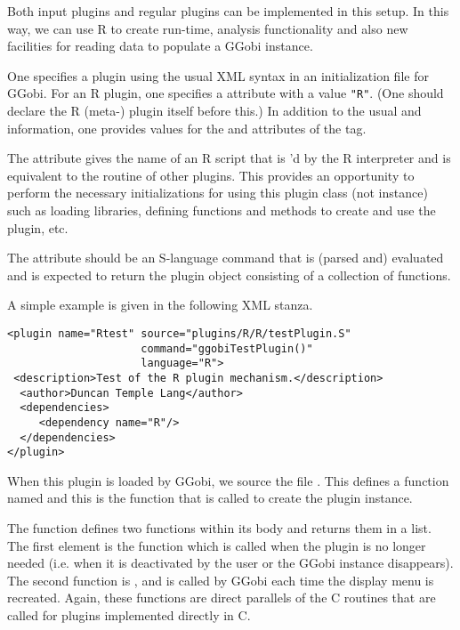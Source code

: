\documentclass{article}
\begin{document}
Both input plugins and regular plugins can be implemented in this
setup. In this way, we can use R to create run-time, analysis
functionality and also new facilities for reading data to populate a
GGobi instance.

One specifies a plugin using the usual XML  syntax in
an initialization file for GGobi.  For an R plugin, one specifies a
 attribute with a value \verb+"R"+.  (One should
declare the R (meta-) plugin itself before this.)  In addition to the
usual  and  information, one
provides values for the  and  attributes
of the  tag.

The  attribute gives the name of an R script that is
'd by the R interpreter and is equivalent to the
 routine of other plugins.  This provides an
opportunity to perform the necessary initializations for using this
plugin class (not instance) such as loading libraries, defining
functions and methods to create and use the plugin, etc.

The  attribute should be an S-language command that is
(parsed and) evaluated and is expected to return the plugin object
consisting of a collection of functions.

A simple example is given in the following XML stanza.
\begin{verbatim}
<plugin name="Rtest" source="plugins/R/R/testPlugin.S" 
                     command="ggobiTestPlugin()"
                     language="R">
 <description>Test of the R plugin mechanism.</description>
  <author>Duncan Temple Lang</author>
  <dependencies>
     <dependency name="R"/>
  </dependencies>
</plugin>
\end{verbatim}
When this plugin is loaded by GGobi, we source the file
.  This defines a function named
 and this is the function that is called to
create the plugin instance.

The  function defines two functions within
its body and returns them in a list.  The first element is the
 function which is called when the plugin is no
longer needed (i.e. when it is deactivated by the user or the GGobi
instance disappears).  The second function is
, and is called by GGobi each time the
display menu is recreated. Again, these functions are direct parallels
of the C routines that are called for plugins implemented directly in
C.
\end{document}
